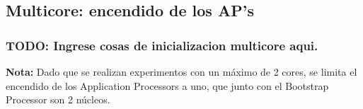 \subsection{Multicore: encendido de los AP's}
    \subsubsection{TODO: Ingrese cosas de inicializacion multicore aqui.}

    \textbf{Nota: } Dado que se realizan experimentos con un máximo de 2 cores, se limita el encendido de los Application Processors a uno, que junto con el Bootstrap Processor son 2 núcleos.